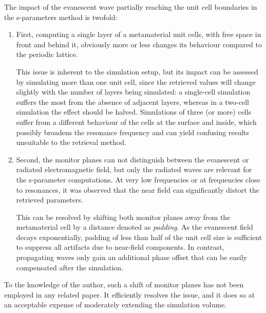 The impact of the evanescent wave partially reaching the unit cell boundaries in the s-parameters method is twofold:
\begin{enumerate}
 \item{First, computing a single layer of a metamaterial unit cells, with free space in front and behind it, obviously more or less changes its behaviour compared to the periodic lattice. 

This issue is inherent to the simulation setup, but its impact can be assessed by simulating more than one unit cell, since the retrieved values will change slightly with the number of layers being simulated: a single-cell simulation suffers the most from the absence of adjacent layers, whereas in a two-cell simulation the effect should be halved. Simulations of three (or more) cells suffer from a different behaviour of the cells at the surface and inside, which possibly broadens the resonance frequency and can yield confusing results unsuitable to the retrieval method.
 } 
 \item{Second, the monitor planes can not distinguish between the evanescent or radiated electromagnetic field, but only the radiated waves are relevant for the s-parameter computations. At very low frequencies or at frequencies close to resonances, it was observed that the near field can significantly distort the retrieved parameters.

This can be resolved by shifting both monitor planes away from the metamaterial cell by a distance denoted as \textit{padding}. As the evanescent field decays exponentially, padding of less than half of the unit cell size is sufficient to suppress all artifacts due to near-field components. In contrast, propagating waves only gain an additional phase offset that can be easily compensated after the simulation. } 
 \end{enumerate}
To the knowledge of the author, such a shift of monitor planes has not been employed in any related paper. It efficiently resolves the issue, and it does so at an acceptable expense of moderately extending the simulation volume. %


